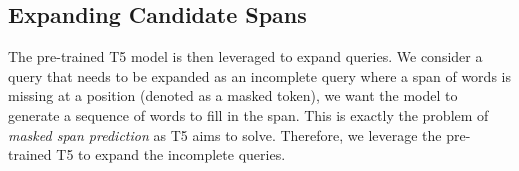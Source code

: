 \documentclass[sigconf,screen]{acmart}
\begin{document}



\subsection{Expanding Candidate Spans} 
\label{ss:approach:step2}
The pre-trained T5 model is then leveraged to expand queries. 
We consider a query that needs to be expanded as an incomplete query where a span of words is missing at a position (denoted as a masked token), we want the model to generate a sequence of words to fill in the span. This is exactly the problem of \emph{masked span prediction} as T5 aims to solve. Therefore, we leverage the pre-trained T5 to expand the incomplete queries. 
\end{document}
